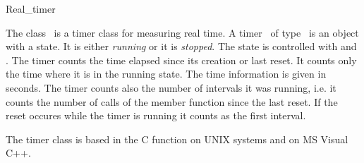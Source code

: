 
\begin{ccRefClass}{Real_timer}

\ccDefinition


The class \ccRefName\ is a timer class for measuring real time.
A timer \ccVar\ of type \ccRefName\ is an object with a state. It is
either {\em running\/} or it is {\em stopped}. The state is controlled
with  and  . The timer counts the
time elapsed since its creation or last reset. It counts only the time
where it is in the running state. The time information is given in seconds.
The timer counts also the number of intervals it was running, i.e. it 
counts the number of calls of the  member function since the 
last reset. If the reset occures while the timer is running it counts as the
first interval.

\ccCreation

\ccPropagateThreeToTwoColumns


\ccOperations

\ccGlue
{}
\ccGlue
{}
\ccGlue
{}

\ccGlue
{} 
\ccGlue
{}
\ccGlue
{}

\ccImplementation

The timer class is based in the C function  on UNIX systems and
 on MS Visual C++.


\end{ccRefClass}
